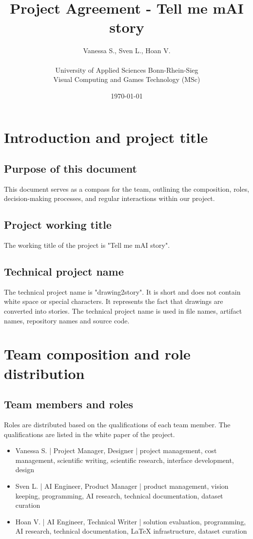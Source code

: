 \documentclass{article}
\title{Project Agreement - Tell me mAI story}
\author{Vanessa S., Sven L., Hoan V. \\\\ University of Applied Sciences Bonn-Rhein-Sieg \\ Visual Computing and Games Technology (MSc)}
\date{\today}
\begin{document}
\maketitle

\section{Introduction and project title}
\subsection{Purpose of this document}
This document serves as a compass for the team, outlining the composition, roles, decision-making processes, and regular interactions within our project.
\subsection{Project working title}
The working title of the project is "Tell me mAI story".
\subsection{Technical project name}
The technical project name is "drawing2story".
It is short and does not contain white space or special characters.
It represents the fact that drawings are converted into stories.
The technical project name is used in file names, artifact names, repository names and source code.

\section{Team composition and role distribution}
\subsection{Team members and roles}
Roles are distributed based on the qualifications of each team member.
The qualifications are listed in the white paper of the project.
\begin{itemize}
    \item Vanessa S. | Project Manager, Designer | project management, cost management, scientific writing, scientific research, interface development, design
    \item Sven L. | AI Engineer, Product Manager | product management, vision keeping, programming, AI research, technical documentation, dataset curation
    \item Hoan V. | AI Engineer, Technical Writer | solution evaluation, programming, AI research, technical documentation, LaTeX infrastructure, dataset curation
\end{itemize}
\end{document}
